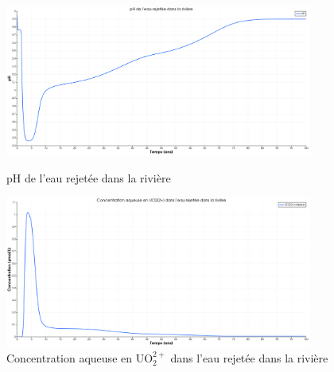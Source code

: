\documentclass{article}
\begin{document}
\begin{figure}[H]
    \centering
    \begin{minipage}{0.5\textwidth}
        \centering
        \includegraphics[width=0.9\textwidth]{III_B_2_5.png} 
        \caption{pH de l'eau rejetée dans la rivière}
        \label{fig:pH_sable_Base}
    \end{minipage}\hfill
    \begin{minipage}{0.5\textwidth}
        \centering
        \includegraphics[width=0.9\textwidth]{III_B_2_6.png} 
        \caption{Concentration aqueuse en UO$_2^{2+}$ dans l'eau rejetée dans la rivière}
        \label{fig:UO2_riviere_sable_base}
    \end{minipage}
\end{figure}
\end{document}
